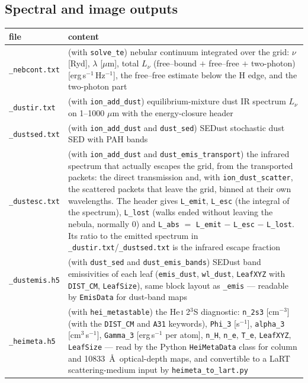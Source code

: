 \documentclass[english,a4paper]{my_memo}
\newcommand{\code}[1]{\texttt{#1}}
\begin{document}
\subsection{Spectral and image outputs}
\begin{center}\small
\begin{tabular}{lp{9.2cm}}
\toprule
file & content \\
\midrule
\code{\_nebcont.txt} & (with \code{solve\_te}) nebular continuum integrated over the grid: $\nu$ [Ryd], $\lambda$ [$\mu$m], total $L_\nu$ (free--bound $+$ free--free $+$ two-photon) [erg\,s$^{-1}$\,Hz$^{-1}$], the free--free estimate below the H edge, and the two-photon part \\
\code{\_dustir.txt} & (with \code{ion\_add\_dust}) equilibrium-mixture dust IR spectrum $L_\nu$ on 1--1000 $\mu$m with the energy-closure header \\
\code{\_dustsed.txt} & (with \code{ion\_add\_dust} and \code{dust\_sed}) SEDust stochastic dust SED with PAH bands \\
\code{\_dustesc.txt} & (with \code{ion\_add\_dust} and \code{dust\_emis\_transport}) the infrared spectrum that actually escapes the grid, from the transported packets: the direct transmission and, with \code{ion\_dust\_scatter}, the scattered packets that leave the grid, binned at their own wavelengths.  The header gives \code{L\_emit}, \code{L\_esc} (the integral of the spectrum), \code{L\_lost} (walks ended without leaving the nebula, normally 0) and \code{L\_abs} $=$ \code{L\_emit} $-$ \code{L\_esc} $-$ \code{L\_lost}.  Its ratio to the emitted spectrum in \code{\_dustir.txt}/\code{\_dustsed.txt} is the infrared escape fraction \\
\code{\_dustemis.h5} & (with \code{dust\_sed} and \code{dust\_emis\_bands}) SEDust band emissivities of each leaf (\code{emis\_dust}, \code{wl\_dust}, \code{LeafXYZ} with \code{DIST\_CM}, \code{LeafSize}), same block layout as \code{\_emis} --- readable by \code{EmisData} for dust-band maps \\
\code{\_heimeta.h5} & (with \code{hei\_metastable}) the He\,\textsc{i} 2$^3$S diagnostic: \code{n\_2s3} [cm$^{-3}$] (with the \code{DIST\_CM} and \code{A31} keywords), \code{Phi\_3} [s$^{-1}$], \code{alpha\_3} [cm$^3$\,s$^{-1}$], \code{Gamma\_3} [erg\,s$^{-1}$ per atom], \code{n\_H}, \code{n\_e}, \code{T\_e}, \code{LeafXYZ}, \code{LeafSize} --- read by the Python \code{HeiMetaData} class for column and 10833~\AA\ optical-depth maps, and convertible to a LaRT scattering-medium input by \code{heimeta\_to\_lart.py} \\

\end{tabular}
\end{center}
\end{document}
